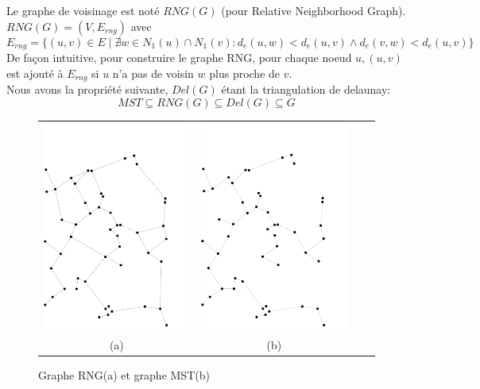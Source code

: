\begin{mydef}
 Le graphe de voisinage est noté $RNG(G)$ (pour Relative Neighborhood Graph).\\
 $RNG(G)=(V,E_{rng})$ avec $$E_{rng}=\{ (u,v)\in E \mid \nexists w\in N_1(u)\cap N_1(v): d_e(u,w)<d_e(u,v) \wedge d_e(v,w)<d_e(u,v)  \}$$
 De façon intuitive, pour construire le graphe RNG, pour chaque noeud $u,(u,v)$ est ajouté à $E_{rng}$ si $u$ n'a pas de voisin $w$ plus proche de $v$.\\
 Nous avons la propriété suivante, $Del(G)$ étant la triangulation de delaunay: $$  MST\subseteq RNG(G)\subseteq Del(G) \subseteq G$$

\end{mydef}

\begin{figure}[tb]
    \centering
    \begin{tabular}{cccc}
      
      \includegraphics[angle=90, scale= 0.5,width=.5\linewidth]{Etat_de_l'art/source/GrapheRNG.pdf} &
      \includegraphics[angle=90, scale= 0.5,width=.5\linewidth]{Etat_de_l'art/source/GrapheMST.pdf} 
   \\
      (a) & (b) \\
    \end{tabular}
    \caption{Graphe RNG(a) et graphe MST(b) \label{fig:ex}}
\end{figure}


